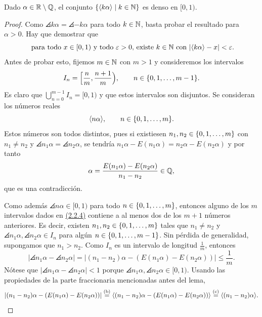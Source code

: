\documentclass[a4paper, 12pt, oneside]{book}
\begin{document}
\begin{lemma}
    Dado $\alpha \in \mathbb R \setminus \mathbb Q$, el conjunto $\{\langle k\alpha \rangle \mid k \in \mathbb N\}$ es denso en $[0,1)$.
\end{lemma}

\begin{proof}
    Como $\angles{k\alpha} = \angles{-k\alpha}$ para todo $k \in \mathbb N$, basta probar el resultado para $\alpha > 0$. Hay que demostrar que 
    \begin{equation}\label{2.2.3}
    \textup{ para todo } x \in [0,1) \textup{ y todo } \varepsilon > 0 \textup{, existe } k \in \mathbb N \textup{ con } |\langle k\alpha \rangle-x|<\varepsilon.
    \end{equation}
    Antes de probar esto, fijemos $m \in \mathbb N$ con $m > 1$ y consideremos los intervalos
    \begin{equation}\label{2.2.4}
        I_n = \Bigl[\frac{n}{m},\frac{n+1}{m}\Bigr), \qquad n \in \{0,1,\mathellipsis,m-1\}.
    \end{equation}
    Es claro que $\bigcup_{n=0}^{m-1}I_n = [0,1)$ y que estos intervalos son disjuntos. Se consideran los números reales
    \[\langle n\alpha \rangle, \qquad n \in \{0,1,\mathellipsis,m\}.\]
    Estos números son todos distintos, pues si existiesen $n_1,n_2\in\{0,1,\mathellipsis,m\}$ con $n_1 \neq n_2$ y $\angles{n_1\alpha} = \angles{n_2\alpha}$, se tendría $n_1\alpha-E(n_1\alpha) = n_2\alpha-E(n_2\alpha)$ y por tanto
    \[\alpha = \frac{E(n_1\alpha)-E(n_2\alpha)}{n_1-n_2} \in \mathbb Q,\] que es una contradicción.
    
    Como además $\angles{n\alpha}\in[0,1)$ para todo $n \in \{0,1,\mathellipsis,m\}$, entonces alguno de los $m$ intervalos dados en \hyperref[2.2.4]{\color{blue}(2.2.4)} contiene a al menos dos de los $m+1$ números anteriores. Es decir, existen  $n_1,n_2 \in \{0,1,\mathellipsis,m\}$ tales que $n_1 \neq n_2$ y $\angles{n_1\alpha},\angles{n_2\alpha} \in I_n$ para algún $n \in \{0,1,\mathellipsis,m-1\}$. Sin pérdida de generalidad, supongamos que $n_1 > n_2$. Como $I_n$ es un intervalo de longitud $\frac{1}{m}$, entonces
    \[|\angles{n_1\alpha}-\angles{n_2\alpha}| = |(n_1-n_2)\alpha -(E(n_1\alpha)-E(n_2\alpha))| \leq \frac{1}{m}.\]
    Nótese que $|\angles{n_1\alpha}-\angles{n_2\alpha}| < 1$ porque $\angles{n_1\alpha},\angles{n_2\alpha} \in [0,1)$. Usando las propiedades de la parte fraccionaria mencionadas antes del lema,
    \[|(n_1-n_2)\alpha -(E(n_1\alpha)-E(n_2\alpha))| \overset{(\textup{b})}{=} \langle (n_1-n_2)\alpha -(E(n_1\alpha)-E(n_2\alpha)) \rangle  \overset{(\textup{c})}{=} \langle (n_1-n_2)\alpha \rangle.\]


\end{proof}
\end{document}
